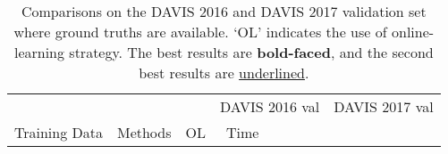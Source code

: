\documentclass[runningheads]{llncs}
\begin{document}
\begin{table}
\caption{Comparisons on the DAVIS 2016 and DAVIS 2017 validation set where ground truths are available. `OL' indicates the use of online-learning strategy. The best results are \textbf{bold-faced}, and the second best results are \underline{underlined}.
}
\label{tab_davis16}
\centering
\begin{tabular}{clc|cccc|ccc}
\toprule
                               &                                        &            & \multicolumn{4}{c|}{DAVIS 2016 val}                                & \multicolumn{3}{c}{DAVIS 2017 val}                     \\
\multicolumn{1}{c}{Training Data} & \multicolumn{1}{c}{Methods}            & \; OL \;        & Time     &  &  &  &  &  &  \\
\midrule


\end{tabular}
\end{table}
\end{document}
